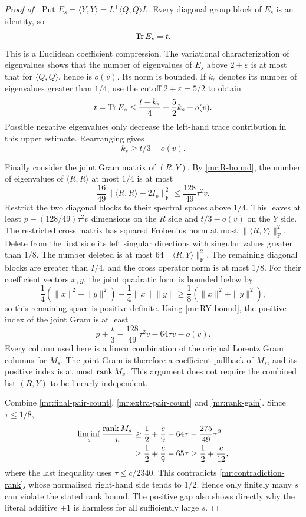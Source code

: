 \begin{proof}[Proof of ]
Put $E_s=\langle Y,Y\rangle=L^{\mathsf T}\langle Q,Q\rangle L$.
Every diagonal group block of $E_s$ is an identity, so
\begin{equation}\label{mr:Y-trace}
 \operatorname{Tr} E_s=t.
\end{equation}
This is a Euclidean coefficient compression.  The variational
characterization of eigenvalues shows that the number of eigenvalues
of $E_s$ above $2+\varepsilon$ is at most that for
$\langle Q,Q\rangle$, hence is $o(v)$.  Its norm is bounded.
If $k_s$ denotes its number of eigenvalues greater than $1/4$, use
the cutoff $2+\varepsilon=5/2$ to obtain
\[
 t=\operatorname{Tr} E_s\le\frac{t-k_s}{4}+\frac52k_s+o(v).
\]
Possible negative eigenvalues only decrease the left-hand trace
contribution in this upper estimate.  Rearranging gives
\begin{equation}\label{mr:Y-positive-count}
 k_s\ge t/3-o(v).
\end{equation}

Finally consider the joint Gram matrix of $(R,Y)$.  By
\eqref{mr:R-bound}, the number of eigenvalues of
$\langle R,R\rangle$ at most $1/4$ is at most
\[
 \frac{16}{49}\|\langle R,R\rangle-2I_p\|_{\mathrm F}^2
 \le\frac{128}{49}\tau^2v.
\]
Restrict the two diagonal blocks to their spectral spaces above
$1/4$.  This leaves at least
$p-(128/49)\tau^2v$ dimensions on the $R$ side and
$t/3-o(v)$ on the $Y$ side.  The restricted cross matrix has squared
Frobenius norm at most $\|\langle R,Y\rangle\|_{\mathrm F}^2$.
Delete from the first side its left singular directions with singular
values greater than $1/8$.  The number deleted is at most
$64\|\langle R,Y\rangle\|_{\mathrm F}^2$.  The remaining diagonal
blocks are greater than $I/4$, and the cross operator norm is at most
$1/8$.  For their coefficient vectors $x,y$, the joint quadratic form
is bounded below by
\[
 \frac14(\|x\|^2+\|y\|^2)-\frac14\|x\|\|y\|
 \ge\frac18(\|x\|^2+\|y\|^2),
\]
so this remaining space is positive definite.  Using
\eqref{mr:RY-bound}, the positive index of the joint Gram is at least
\begin{equation}\label{mr:rank-gain}
 p+\frac t3-\frac{128}{49}\tau^2v-64\tau v-o(v).
\end{equation}
Every column used here is a linear combination of the original Lorentz
Gram columns for $M_s$.  The joint Gram is therefore a coefficient
pullback of $M_s$, and its positive index is at most $\operatorname{rank} M_s$.
This argument does not require the combined list $(R,Y)$ to be
linearly independent.

Combine \eqref{mr:final-pair-count}, \eqref{mr:extra-pair-count} and
\eqref{mr:rank-gain}.  Since $\tau\le1/8$,
\begin{align*}
 \liminf_s\frac{\operatorname{rank} M_s}{v}
 &\ge\frac12+\frac c9-64\tau-\frac{275}{49}\tau^2\\
 &\ge\frac12+\frac c9-65\tau
 \ge\frac12+\frac c{12},
\end{align*}
where the last inequality uses $\tau\le c/2340$.
This contradicts \eqref{mr:contradiction-rank}, whose normalized
right-hand side tends to $1/2$.  Hence only finitely many $s$ can
violate the stated rank bound.  The positive gap also shows directly
why the literal additive $+1$ is harmless for all sufficiently large
$s$.


\end{proof}
